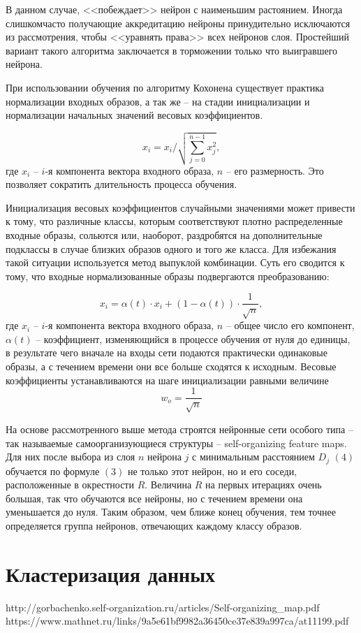 \documentclass[bachelor, och, referat]{SCWorks}
\begin{document}
В данном случае, <<побеждает>> нейрон с наименьшим растоянием.
Иногда слишкомчасто получающие аккредитацию нейроны 
принудительно исключаются из рассмотрения,
чтобы <<уравнять права>> всех нейронов слоя. 
Простейший вариант такого алгоритма
заключается в торможении только что выигравшего нейрона. 

При использовании обучения по алгоритму Кохонена существует практика нормализации
входных образов, а так же -- на стадии инициализации и нормализации начальных значений
весовых коэффициентов. 

\[ x_i = x_i / \sqrt{\sum_{j = 0}^{n - 1} x_j^2}, \]
где $x_i$ -- $i$-я компонента вектора входного образа, $n$ -- его размерность.
Это позволяет сократить длительность процесса обучения.

Инициализация весовых коэффициентов случайными значениями может привести к
тому, что различные классы, которым соответствуют плотно распределенные входные образы,
сольются или, наоборот, раздробятся на дополнительные подклассы в случае близких образов
одного и того же класса. Для избежания такой ситуации используется метод выпуклой
комбинации. Суть его сводится к тому, что входные нормализованные образы подвергаются
преобразованию: 

\[ x_i = \alpha(t) \cdot x_i + (1 - \alpha(t)) \cdot \frac{1}{\sqrt{n}}, \]
где $x_i$ -- $i$-я компонента вектора входного образа, $n$ -- общее число его компонент,
$\alpha(t)$ -- коэффициент, изменяющийся в процессе обучения от нуля до единицы, 
в результате чего вначале на
входы сети подаются практически одинаковые образы, а с течением времени они все больше
сходятся к исходным. Весовые коэффициенты устанавливаются на шаге инициализации
равными величине
\[ w_o = \frac{1}{\sqrt{n}} \]

На основе рассмотренного выше метода строятся нейронные сети особого типа -- так
называемые самоорганизующиеся структуры -- self-organizing feature maps. 
Для них после выбора из слоя $n$ нейрона $j$ с
минимальным расстоянием $D_j$ $(4)$ обучается по формуле $(3)$ не только этот нейрон, но и его
соседи, расположенные в окрестности $R$. Величина $R$ на первых итерациях очень большая, так
что обучаются все нейроны, но с течением времени она уменьшается до нуля. Таким образом,
чем ближе конец обучения, тем точнее определяется группа нейронов, отвечающих каждому
классу образов.

\section{Кластеризация данных}
http://gorbachenko.self-organization.ru/articles/Self-organizing_map.pdf
https://www.mathnet.ru/links/9a5e61bf9982a36450ce37e839a997ca/at11199.pdf
\end{document}
